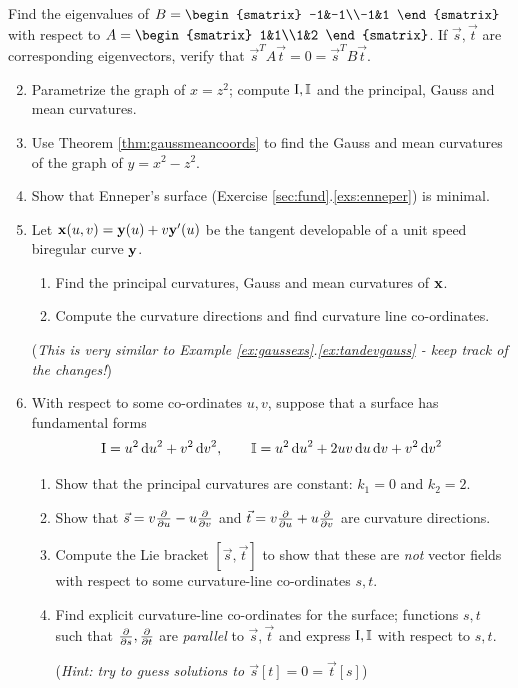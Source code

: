 \begin{exercises}{}{}
	\exstart Find the eigenvalues of $B=
	\begin{smatrix}
		-1&-1\\-1&1
	\end{smatrix}$
	with respect to $A=
	\begin{smatrix}
		1&1\\1&2
	\end{smatrix}$.
	If $\vec s,\vec t$ are corresponding eigenvectors, verify that $\vec s^TA\vec t=0=\vec s^TB\vec t$.


\begin{enumerate}\setcounter{enumi}{1}
  \item Parametrize the graph of $x=z^2$; compute $\mathrm{I},\mathbb{I}$ and the principal, Gauss and mean curvatures.
  
  
  \item Use Theorem \ref{thm:gaussmeancoords} to find the Gauss and mean curvatures of the graph of $y=x^2-z^2$.
  
  
  \item Show that Enneper's surface (Exercise \ref*{sec:fund}.\ref{exs:enneper}) is minimal.
    

  \item\label{exs:tandevcurv} Let ${\mathbf{x}}(u,v)={\mathbf{y}}(u)+v{\mathbf{y}}'(u)$ be the tangent developable of a unit speed biregular curve ${\mathbf{y}}$.
  \begin{enumerate}
    \item Find the principal curvatures, Gauss and mean curvatures of ${\mathbf{x}}$.
		\item Compute the curvature directions and find curvature line co-ordinates.
	\end{enumerate}
	(\emph{This is very similar to Example \ref*{ex:gaussexs}.\ref{ex:tandevgauss} - keep track of the changes!})
	
	
	\item With respect to some co-ordinates $u,v$, suppose that a surface has fundamental forms
	\[
		\mathrm{I}=u^2\,{\mathrm{d} u}^2+v^2\,{\mathrm{d} v}^2,\qquad \mathbb{I}=u^2\,{\mathrm{d} u}^2+2uv\,{\mathrm{d} u}\,{\mathrm{d} v}+v^2\,{\mathrm{d} v}^2
	\]
	
	\begin{enumerate}
	  \item Show that the principal curvatures are constant: $k_1=0$ and $k_2=2$.
	  \item Show that $\vec s= v\frac{\partial }{\partial u}-u\frac{\partial }{\partial v}$ and $\vec t=v\frac{\partial }{\partial u}+u\frac{\partial }{\partial v}$ are curvature directions.
	  \item Compute the Lie bracket $[\vec s,\vec t]$ to show that these are \emph{not} vector fields with respect to some curvature-line co-ordinates $s,t$.
	  \item Find explicit curvature-line co-ordinates for the surface; functions $s,t$ such that $\frac{\partial }{\partial s},\frac{\partial }{\partial t}$ are \emph{parallel} to $\vec s,\vec t$ and express $\mathrm{I},\mathbb{I}$ with respect to $s,t$.\par
	  (\emph{Hint: try to guess solutions to $\vec s[t]=0=\vec t[s]$})
	\end{enumerate}
	

\end{enumerate}
\end{exercises}
